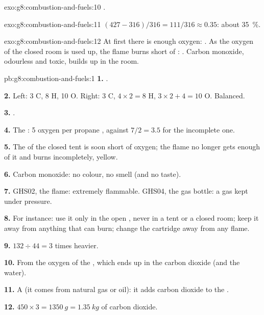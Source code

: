 \begin{solution}{exo:g8:combustion-and-fuels:10}
.
\end{solution}

\begin{solution}{exo:g8:combustion-and-fuels:11}
$(427 - 316)/316 = 111/316 \approx 0.35$: about \qty{35}{\percent}.
\end{solution}

\begin{solution}{exo:g8:combustion-and-fuels:12}
At first there is enough oxygen: . As the
oxygen of the closed room is used up, the flame burns short of :
. Carbon monoxide, odourless and toxic,
builds up in the room.
\end{solution}

\begin{solution}{pb:g8:combustion-and-fuels:1}
\textbf{1.} .

\textbf{2.} Left: 3 C, 8 H, 10 O. Right: 3 C, $4 \times 2 = 8$ H,
$3 \times 2 + 4 = 10$ O. Balanced.

\textbf{3.} .

\textbf{4.} The : 5 oxygen  per propane
, against $7/2 = 3.5$ for the incomplete one.

\textbf{5.} The  of the closed tent is soon short of oxygen; the
flame no longer gets enough of it and burns incompletely, yellow.

\textbf{6.} Carbon monoxide: no colour, no smell (and no taste).

\textbf{7.} GHS02, the flame: extremely flammable. GHS04, the gas
bottle: a gas kept under pressure.

\textbf{8.} For instance: use it only in the open , never in a tent
or a closed room; keep it away from anything that can burn; change the
cartridge away from any flame.

\textbf{9.} $132 \div 44 = 3$ times heavier.

\textbf{10.} From the oxygen of the , which ends up in the carbon
dioxide (and the water).

\textbf{11.} A  (it comes from natural gas or oil): 
it adds carbon dioxide to the .

\textbf{12.} $450 \times 3 = \qty{1350}{g} = \qty{1.35}{kg}$ of carbon
dioxide.
\end{solution}

